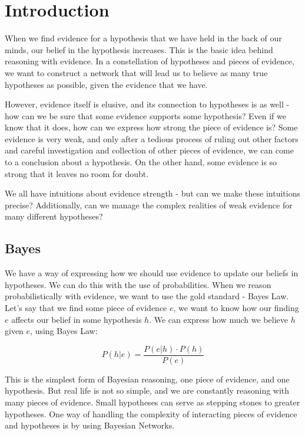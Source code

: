  

\chapter[Introduction]{Introduction}


When we find evidence for a hypothesis that we have held in the back of our minds, our belief in the hypothesis increases. This is the basic idea behind reasoning with evidence. In a constellation of hypotheses and pieces of evidence, we want to construct a network that will lead us to believe as many true hypotheses as possible, given the evidence that we have.

However, evidence itself is elusive, and its connection to hypotheses is as well - how can we be sure that some evidence supports some hypothesis? Even if we know that it does, how can we express how strong the piece of evidence is? Some evidence is very weak, and only after a tedious process of ruling out other factors and careful investigation and collection of other pieces of evidence, we can come to a conclusion about a hypothesis. On the other hand, some evidence is so strong that it leaves no room for doubt.

We all have intuitions about evidence strength - but can we make these intuitions precise? Additionally, can we manage the complex realities of weak evidence for many different hypotheses? 

\section{Bayes}

We have a way of expressing how we should use evidence to update our beliefs in hypotheses. We can do this with the use of probabilities. When we reason probabilistically with evidence, we want to use the gold standard - Bayes Law.
Let's say that we find some piece of evidence $e$, we want to know how our finding $e$ affects our belief in some hypothesis $h$. We can express how much we believe $h$ given $e$, using Bayes Law:

\[ P(h | e) =  \frac{P(e | h) \cdot P(h)}{P(e)}\]


This is the simplest form of Bayesian reasoning, one piece of evidence, and one hypothesis. But real life is not so simple, and we are constantly reasoning with many pieces of evidence. Small hypotheses can serve as stepping stones to greater hypotheses. One way of handling the complexity of interacting pieces of evidence and hypotheses is by using Bayesian Networks.

